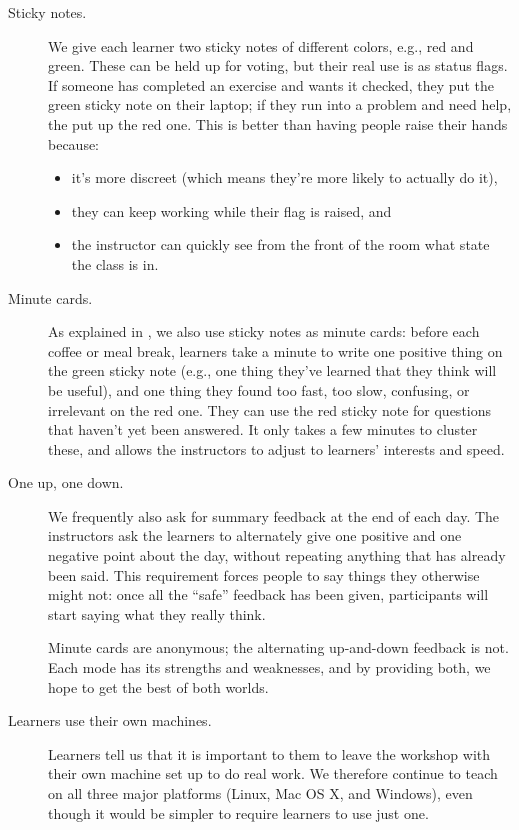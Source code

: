 \begin{description}
\item[Sticky notes.]
We give each learner two sticky notes of different colors, e.g., red and
green. These can be held up for voting, but their real use is as status
flags. If someone has completed an exercise and wants it checked, they
put the green sticky note on their laptop; if they run into a problem
and need help, the put up the red one. This is better than having people
raise their hands because:

\begin{itemize}
\item
  it's more discreet (which means they're more likely to actually do
  it),
\item
  they can keep working while their flag is raised, and
\item
  the instructor can quickly see from the front of the room what state
  the class is in.
\end{itemize}
\item[Minute cards.]
As explained in ,
we also use sticky notes as minute cards: before each coffee or meal
break, learners take a minute to write one positive thing on the green
sticky note (e.g., one thing they've learned that they think will be
useful), and one thing they found too fast, too slow, confusing, or
irrelevant on the red one. They can use the red sticky note for
questions that haven't yet been answered. It only takes a few minutes to
cluster these, and allows the instructors to adjust to learners'
interests and speed.
\item[One up, one down.]
We frequently also ask for summary feedback at the end of each day. The
instructors ask the learners to alternately give one positive and one
negative point about the day, without repeating anything that has
already been said. This requirement forces people to say things they
otherwise might not: once all the ``safe'' feedback has been given,
participants will start saying what they really think.

Minute cards are anonymous; the alternating up-and-down feedback is not.
Each mode has its strengths and weaknesses, and by providing both, we
hope to get the best of both worlds.
\item[Learners use their own machines.]
Learners tell us that it is important to them to leave the workshop with
their own machine set up to do real work. We therefore continue to teach
on all three major platforms (Linux, Mac OS X, and Windows), even though
it would be simpler to require learners to use just one.


\end{description}
